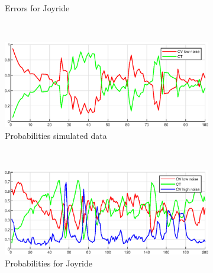\begin{figure}[ht]
\begin{subfigure}[b]{0.4\textwidth}
        \caption{Errors for Joyride}
        \label{fig:ga_1_joyride_error}
    \end{subfigure}
        \\
    \begin{subfigure}[b]{0.4\textwidth}
        \includegraphics[width=\textwidth]{figures/ga_1/2_probs}
        \caption{Probabilities simulated data}
        \label{fig:ga_1_2_error}
    \end{subfigure}%
    ~
    \begin{subfigure}[b]{0.4\textwidth}
        \includegraphics[width=\textwidth]{figures/ga_1/joyride_probs}
        \caption{Probabilities for Joyride}
        \label{fig:ga_1_joyride_error}
    \end{subfigure}
    \caption{}
    \label{fig:ga_1} 
\end{figure}






